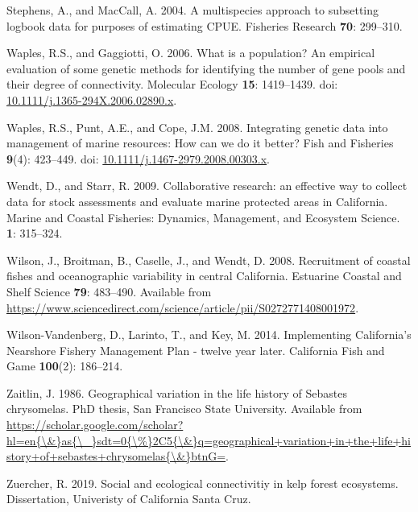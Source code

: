\documentclass[12pt,]{article}
\begin{document}
\hypertarget{ref-Stephens2004}{}
Stephens, A., and MacCall, A. 2004. A multispecies approach to
subsetting logbook data for purposes of estimating CPUE. Fisheries
Research \textbf{70}: 299--310.

\hypertarget{ref-Waples2006}{}
Waples, R.S., and Gaggiotti, O. 2006. What is a population? An empirical
evaluation of some genetic methods for identifying the number of gene
pools and their degree of connectivity. Molecular Ecology \textbf{15}:
1419--1439. doi:
\href{https://doi.org/10.1111/j.1365-294X.2006.02890.x}{10.1111/j.1365-294X.2006.02890.x}.

\hypertarget{ref-Waples2008}{}
Waples, R.S., Punt, A.E., and Cope, J.M. 2008. Integrating genetic data
into management of marine resources: How can we do it better? Fish and
Fisheries \textbf{9}(4): 423--449. doi:
\href{https://doi.org/10.1111/j.1467-2979.2008.00303.x}{10.1111/j.1467-2979.2008.00303.x}.

\hypertarget{ref-Wendt2009}{}
Wendt, D., and Starr, R. 2009. Collaborative research: an effective way
to collect data for stock assessments and evaluate marine protected
areas in California. Marine and Coastal Fisheries: Dynamics, Management,
and Ecosystem Science. \textbf{1}: 315--324.

\hypertarget{ref-Wilson2008}{}
Wilson, J., Broitman, B., Caselle, J., and Wendt, D. 2008. Recruitment
of coastal fishes and oceanographic variability in central California.
Estuarine Coastal and Shelf Science \textbf{79}: 483--490. Available
from
\url{https://www.sciencedirect.com/science/article/pii/S0272771408001972}.

\hypertarget{ref-Vandenberg2014}{}
Wilson-Vandenberg, D., Larinto, T., and Key, M. 2014. Implementing
California's Nearshore Fishery Management Plan - twelve year later.
California Fish and Game \textbf{100}(2): 186--214.

\hypertarget{ref-Zaitlin1986}{}
Zaitlin, J. 1986. Geographical variation in the life history of Sebastes
chrysomelas. PhD thesis, San Francisco State University. Available from
\href{https://scholar.google.com/scholar?hl=en\%7B/\&\%7Das\%7B/_\%7Dsdt=0\%7B/\%\%7D2C5\%7B/\&\%7Dq=geographical+variation+in+the+life+history+of+sebastes+chrysomelas\%7B/\&\%7DbtnG=}{https://scholar.google.com/scholar?hl=en\{\textbackslash{}\&\}as\{\textbackslash{}\_\}sdt=0\{\textbackslash{}\%\}2C5\{\textbackslash{}\&\}q=geographical+variation+in+the+life+history+of+sebastes+chrysomelas\{\textbackslash{}\&\}btnG=}.

\hypertarget{ref-Zuercher2019}{}
Zuercher, R. 2019. Social and ecological connectivitiy in kelp forest
ecosystems. Dissertation, Univeristy of California Santa Cruz.
\end{document}
